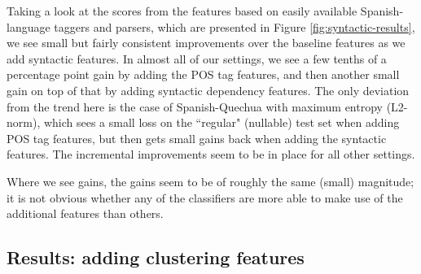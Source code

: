 Taking a look at the scores from the features based on easily available
Spanish-language taggers and parsers, which are presented in Figure
\ref{fig:syntactic-results}, we see small but fairly consistent improvements
over the baseline features as we add syntactic features. In almost all of our
settings, we see a few tenths of a percentage point gain by adding the POS tag
features, and then another small gain on top of that by adding syntactic
dependency features. The only deviation from the trend here is the case of
Spanish-Quechua with maximum entropy (L2-norm), which sees a small loss on the
``regular" (nullable) test set when adding POS tag features, but then gets
small gains back when adding the syntactic features. The incremental
improvements seem to be in place for all other settings.

Where we see gains, the gains seem to be of roughly the same (small) magnitude;
it is not obvious whether any of the classifiers are more able to make use of
the additional features than others.

\subsection{Results: adding clustering features}

